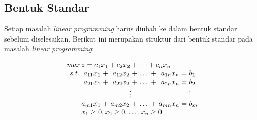 			

\subsection{Bentuk Standar}
Setiap masalah \textit{linear programming} harus diubah ke dalam bentuk standar sebelum diselesaikan. Berikut ini merupakan struktur dari bentuk standar pada masalah \textit{linear programming}:
    	
\begin{equation*}
	\setlength\arraycolsep{1.5pt}
	\begin{array}{r r c r c r c r c l}
	    \textit{max}		& \multicolumn{9}{l}{z = c_1x_1 + c_2x_2 + \dots + c_nx_n} \\
		\textit{s.t.} 	& a_{11}x_1 & + & a_{12}x_2 & + & \dots & + & a_{1n}x_n & = & b_1 \\
    						& a_{21}x_1 & + & a_{22}x_2 & + & \dots & + & a_{2n}x_n & = & b_2 \\
                            & \multicolumn{7}{c}{\vdots}                            &   & \vdots \\
                            & a_{m1}x_1 & + & a_{m2}x_2 & + & \dots & + & a_{mn}x_n & = & b_m \\
                            & \multicolumn{9}{l}{x_1\geq0,x_2\geq0,\dots,x_n\geq0}
	\end{array}
\end{equation*}


